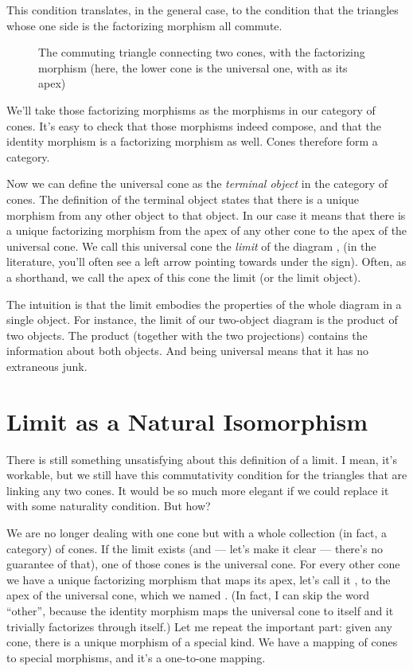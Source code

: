 This condition translates, in the general case, to the condition that
the triangles whose one side is the factorizing morphism all commute.

\begin{figure}[H]
\centering
{}
\caption{The commuting triangle connecting two cones, with the factorizing
morphism  (here, the lower cone is the universal one, with
 as its apex)}
\end{figure}

\noindent
We'll take those factorizing morphisms as the morphisms in our category
of cones. It's easy to check that those morphisms indeed compose, and
that the identity morphism is a factorizing morphism as well. Cones
therefore form a category.

Now we can define the universal cone as the \emph{terminal object} in
the category of cones. The definition of the terminal object states that
there is a unique morphism from any other object to that object. In our
case it means that there is a unique factorizing morphism from the apex
of any other cone to the apex of the universal cone. We call this
universal cone the \emph{limit} of the diagram ,  (in
the literature, you'll often see a left arrow pointing towards 
under the  sign). Often, as a shorthand, we call the apex of
this cone the limit (or the limit object).

The intuition is that the limit embodies the properties of the whole
diagram in a single object. For instance, the limit of our two-object
diagram is the product of two objects. The product (together with the
two projections) contains the information about both objects. And being
universal means that it has no extraneous junk.

\section{Limit as a Natural Isomorphism}\label{limit-as-a-natural-isomorphism}

There is still something unsatisfying about this definition of a limit.
I mean, it's workable, but we still have this commutativity condition
for the triangles that are linking any two cones. It would be so much
more elegant if we could replace it with some naturality condition. But
how?

We are no longer dealing with one cone but with a whole collection (in
fact, a category) of cones. If the limit exists (and --- let's make it
clear --- there's no guarantee of that), one of those cones is the
universal cone. For every other cone we have a unique factorizing
morphism that maps its apex, let's call it , to the apex of
the universal cone, which we named . (In fact, I can skip
the word ``other'', because the identity morphism maps the universal
cone to itself and it trivially factorizes through itself.) Let me
repeat the important part: given any cone, there is a unique morphism of
a special kind. We have a mapping of cones to special morphisms, and
it's a one-to-one mapping.

